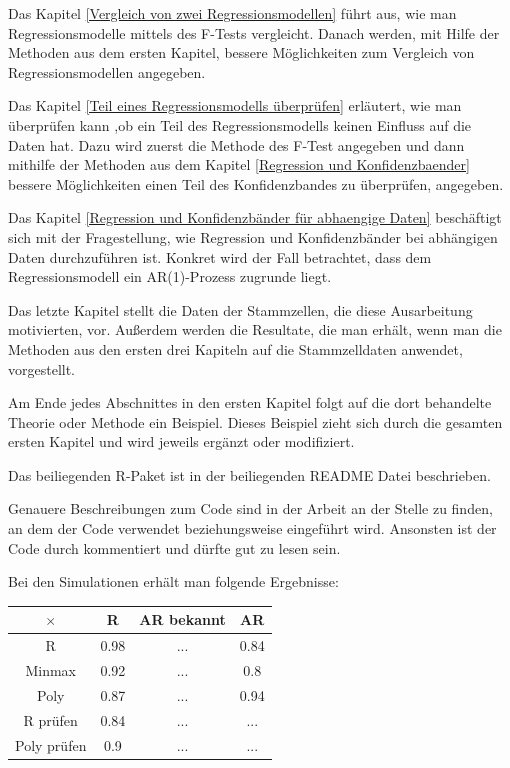 \documentclass[12pt,a4paper]{article}
\theoremstyle{definition}
\theoremstyle{definition}
\theoremstyle{definition}
\theoremstyle{definition}
\newcommand{\UeberRR}{0.98}
\newcommand{\UeberRMinmax}{0.92}
\newcommand{\UeberRMinmaxPoly}{0.87}
\newcommand{\UeberARbekanntR}{...}
\newcommand{\UeberARbekanntMinmax}{...}
\newcommand{\UeberARbekanntMinmaxPoly}{...}
\newcommand{\UeberARR}{0.84}
\newcommand{\UeberARMinmax}{0.8}
\newcommand{\UeberARMinmaxPoly}{0.94}
\newcommand{\UeberRRpruefen}{0.84}
\newcommand{\UeberRMinmaxPolypruefen}{0.9}
\newcommand{\UeberARbekanntRpruefen}{...}
\newcommand{\UeberARbekanntMinmaxPolypruefen}{...}
\newcommand{\UeberARRpruefen}{...}
\newcommand{\UeberARMinmaxPolypruefen}{...}
\begin{document}
Das Kapitel \ref{Vergleich von zwei Regressionsmodellen} führt aus, wie man Regressionsmodelle mittels des F-Tests vergleicht. Danach werden, mit Hilfe der Methoden aus dem ersten Kapitel, bessere Möglichkeiten zum Vergleich von Regressionsmodellen angegeben.

Das Kapitel \ref{Teil eines Regressionsmodells überprüfen} erläutert, wie man überprüfen kann ,ob ein Teil des Regressionsmodells keinen Einfluss auf die Daten hat. Dazu wird zuerst die Methode des F-Test angegeben und dann mithilfe der Methoden aus dem Kapitel \ref{Regression und Konfidenzbaender} bessere Möglichkeiten einen Teil des Konfidenzbandes zu überprüfen, angegeben.

Das Kapitel \ref{Regression und Konfidenzbänder für abhaengige Daten} beschäftigt sich mit der Fragestellung, wie Regression und Konfidenzbänder bei abhängigen Daten durchzuführen ist. Konkret wird der Fall betrachtet, dass dem Regressionsmodell ein AR(1)-Prozess zugrunde liegt.

Das letzte Kapitel stellt die Daten der Stammzellen, die diese Ausarbeitung motivierten, vor. Außerdem werden die Resultate, die man erhält, wenn man die Methoden aus den ersten drei Kapiteln auf die Stammzelldaten anwendet, vorgestellt.

Am Ende jedes Abschnittes in den ersten Kapitel folgt auf die dort behandelte Theorie oder Methode ein Beispiel. Dieses Beispiel zieht sich durch die gesamten ersten Kapitel und wird jeweils ergänzt oder modifiziert.

Das beiliegenden R-Paket ist in der beiliegenden README Datei beschrieben.

Genauere Beschreibungen zum Code sind in der Arbeit an der Stelle zu finden, an dem der Code verwendet beziehungsweise eingeführt wird. Ansonsten ist der Code durch kommentiert und dürfte gut zu lesen sein.

Bei den Simulationen erhält man folgende Ergebnisse:

\begin{center}
\begin{tabular}{|c|c|c|c|}
\hline 
$\times$ & R & AR bekannt & AR \\ 
\hline 
R		 & \UeberRR		  & \UeberARbekanntR & \UeberARR \\ 
\hline 
Minmax	 & \UeberRMinmax  & \UeberARbekanntMinmax & \UeberARMinmax \\ 
\hline 
Poly  & \UeberRMinmaxPoly & \UeberARbekanntMinmaxPoly & \UeberARMinmaxPoly \\ 
\hline 
R prüfen    & \UeberRRpruefen & \UeberARbekanntRpruefen & \UeberARRpruefen \\ 
\hline 
Poly prüfen	& \UeberRMinmaxPolypruefen & \UeberARbekanntMinmaxPolypruefen & \UeberARMinmaxPolypruefen \\ 
\hline 
\end{tabular} 
\end{center}
\end{document}
